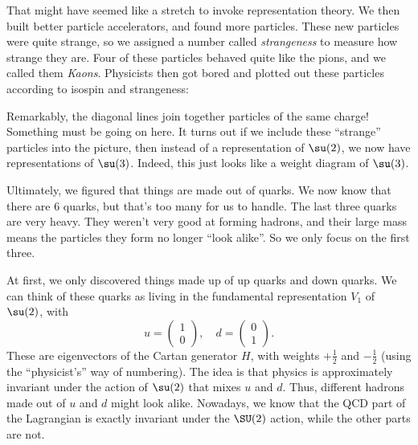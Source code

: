 \documentclass[a4paper]{article}
\begin{document}
That might have seemed like a stretch to invoke representation theory. We then built better particle accelerators, and found more particles. These new particles were quite strange, so we assigned a number called \emph{strangeness} to measure how strange they are. Four of these particles behaved quite like the pions, and we called them \emph{Kaons}. Physicists then got bored and plotted out these particles according to isospin and strangeness:
\begin{center}
\end{center}

Remarkably, the diagonal lines join together particles of the same charge! Something must be going on here. It turns out if we include these ``strange'' particles into the picture, then instead of a representation of $\su(2)$, we now have representations of $\su(3)$. Indeed, this just looks like a weight diagram of $\su(3)$.

Ultimately, we figured that things are made out of quarks. We now know that there are $6$ quarks, but that's too many for us to handle. The last three quarks are very heavy. They weren't very good at forming hadrons, and their large mass means the particles they form no longer ``look alike''. So we only focus on the first three.

At first, we only discovered things made up of up quarks and down quarks. We can think of these quarks as living in the fundamental representation $V_1$ of $\su(2)$, with
\[
  u = 
  \begin{pmatrix}
    1 \\ 0
  \end{pmatrix},\quad
  d =
  \begin{pmatrix}
    0 \\ 1
  \end{pmatrix}.
\]
These are eigenvectors of the Cartan generator $H$, with weights $+\frac{1}{2}$ and $-\frac{1}{2}$ (using the ``physicist's'' way of numbering). The idea is that physics is approximately invariant under the action of $\su(2)$ that mixes $u$ and $d$. Thus, different hadrons made out of $u$ and $d$ might look alike. Nowadays, we know that the QCD part of the Lagrangian is exactly invariant under the $\SU(2)$ action, while the other parts are not.
\end{document}
